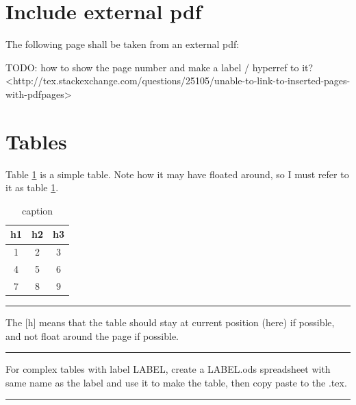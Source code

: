 \documentclass[12pt]{article}
\newcommand{\inOut}[1]{#1}                                %
\begin{document}
%

\section{Include external pdf}\label{extPdf}

The following page shall be taken from an external pdf:



TODO: how to show the page number and make a label / hyperref to it?
<http://tex.stackexchange.com/questions/25105/unable-to-link-to-inserted-pages-with-pdfpages>

\section{Tables}\label{secTab}

    \begin{example} \label{expTab1}
        Table \ref{tab1} is a simple table. Note how it may have floated around, so I must refer to it as table \ref{tab1}.
        \inOut{
            \begin{table}[h]
                \centering
                \begin{tabular}{ccc}
                    h1 & h2 & h3 \\
                    \hline
                    1 & 2 & 3 \\
                    4 & 5 & 6 \\
                    7 & 8 & 9 \\
                \end{tabular}
                \caption{caption}
                \label{tab1}
            \end{table}
        }
    \end{example}\hrule

    \begin{remark} \label{remTab1}
        The [h] means that the table should stay at current position (here) if possible, and not float around the page if possible.
    \end{remark}\hrule

    \begin{remark} \label{remTab2}
        For complex tables with label LABEL, create a LABEL.ods spreadsheet with same name as the label and use it to make the table, then copy paste to the .tex.
    \end{remark}\hrule
\end{document}
